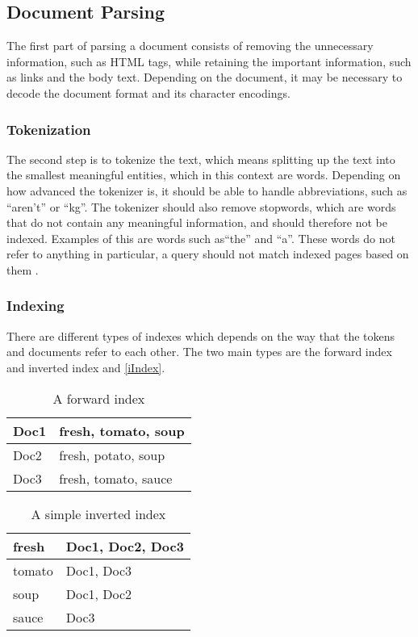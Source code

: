 \subsection{Document Parsing}
The first part of parsing a document consists of removing the unnecessary
information, such as HTML tags, while retaining the important information, such
as links and the body text. Depending on the document, it may be necessary to
decode the document format and its character encodings.

\subsubsection{Tokenization}
The second step is to tokenize the text, which means splitting up the text into
the smallest meaningful entities, which in this context are words. Depending on
how advanced the tokenizer is, it should be able to handle abbreviations,
such as ``aren't'' or ``kg''. The tokenizer should also remove stopwords,
which are words that do not contain any meaningful information,
and should therefore not be indexed. Examples of this are words such as``the'' and ``a''.
These words do not refer to anything in particular, a query should not match
indexed pages based on them \citep[Ch.
2]{manning2008introduction}.

\subsubsection{Indexing}
There are different types of indexes which depends on the way that the tokens
and documents refer to each other. The two main types are the forward index and
inverted index and \autoref{iIndex}.

\begin{minipage}{.40\textwidth}
  \centering
  \begin{table}[H]
	\centering
    \label{fIndex}
    \begin{tabular}{|l|l|}
\hline
Doc1 & fresh, tomato, soup \\ \hline
Doc2 & fresh, potato, soup \\ \hline
Doc3 & fresh, tomato, sauce \\ \hline
	\end{tabular}
	\caption{A forward index}
  \end{table}
\end{minipage}
\begin{minipage}{0.5\textwidth}
  \centering
  \begin{table}[H]
	\centering
    \label{iIndex}
    \begin{tabular}{|l|l|}
\hline
fresh & Doc1, Doc2, Doc3 \\ \hline
tomato & Doc1, Doc3 \\ \hline
soup & Doc1, Doc2 \\ \hline
sauce & Doc3 \\ \hline
	\end{tabular}
	\caption{A simple inverted index}
  \end{table}  
\end{minipage}

